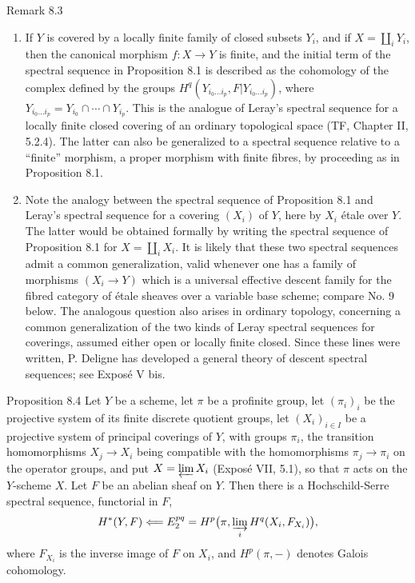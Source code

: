 \begin{remarktext}{Remark 8.3}
\begin{enumerate}[label=\alph*)]
\item If \(Y\) is covered by a locally finite family of closed subsets \(Y_i\), and if \(X=\coprod_iY_i\), then the canonical morphism \(f:X\to Y\) is finite, and the initial term of the spectral sequence in Proposition 8.1 is described as the cohomology of the complex defined by the groups \(H^q(Y_{i_0\ldots i_p},F|Y_{i_0\ldots i_p})\), where \(Y_{i_0\ldots i_p}=Y_{i_0}\cap\cdots\cap Y_{i_p}\). This is the analogue of Leray's spectral sequence for a locally finite closed covering of an ordinary topological space (TF, Chapter II, 5.2.4). The latter can also be generalized to a spectral sequence relative to a ``finite'' morphism, \ie a proper morphism with finite fibres, by proceeding as in Proposition 8.1.
\item Note the analogy between the spectral sequence of Proposition 8.1 and Leray's spectral sequence for a covering \((X_i)\) of \(Y\), here by \(X_i\) \'etale over \(Y\). The latter would be obtained formally by writing the spectral sequence of Proposition 8.1 for \(X=\coprod_iX_i\). It is likely that these two spectral sequences admit a common generalization, valid whenever one has a family of morphisms \((X_i\to Y)\) which is a universal effective descent family for the fibred category of \'etale sheaves over a variable base scheme; compare No. 9 below. The analogous question also arises in ordinary topology, concerning a common generalization of the two kinds of Leray spectral sequences for coverings, assumed either open or locally finite closed. Since these lines were written, P. Deligne has developed a general theory of descent spectral sequences; see Expos\'e V bis.
\end{enumerate}
\end{remarktext}

\begin{statement}{Proposition 8.4}
Let \(Y\) be a scheme, let \(\pi\) be a profinite group, let \((\pi_i)_i\) be the projective system of its finite discrete quotient groups, let \((X_i)_{i\in I}\) be a projective system of principal coverings of \(Y\), with groups \(\pi_i\), the transition homomorphisms \(X_j\to X_i\) being compatible with the homomorphisms \(\pi_j\to\pi_i\) on the operator groups, and put \(X=\varprojlim X_i\) (\cf Expos\'e VII, 5.1), so that \(\pi\) acts on the \(Y\)-scheme \(X\). Let \(F\) be an abelian sheaf on \(Y\). Then there is a Hochschild-Serre spectral sequence, functorial in \(F\),
\[
H^*(Y,F)\Longleftarrow E_2^{pq}=H^p\bigl(\pi,\varinjlim_iH^q(X_i,F_{X_i})\bigr),
\]
where \(F_{X_i}\) is the inverse image of \(F\) on \(X_i\), and \(H^p(\pi,-)\) denotes Galois cohomology.
\end{statement}

